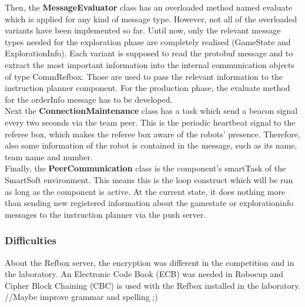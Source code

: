 Then, the \textbf{MessageEvaluator} class has an overloaded method named evaluate which is applied for any kind of message type. However, not all of the overloaded variants have been implemented so far. Until now, only the relevant message types needed for the exploration phase are completely realised (GameState and ExplorationInfo). Each variant is supposed to read the protobuf message and to extract the most important information into the internal communication objects of type CommRefbox. Those are used to pass the relevant information to the instruction planner component. For the production phase, the evaluate method for the orderInfo message has to be developed.\\

Next the \textbf{ConnectionMaintenance} class has a task which send a beacon signal every two seconds via the team peer. This is the periodic heartbeat signal to the referee box, which makes the referee box aware of the robots’ presence. Therefore, also some information of the robot is contained in the message, such as its name, team name and number.\\

Finally, the \textbf{PeerCommunication} class is the component’s smartTask of the SmartSoft environment. This means this is the loop construct which will be run as long as the component is active. At the current state, it does nothing more than sending new registered information about the gamestate or explorationinfo messages to the instruction planner via the push server.\\


\subsubsection{Difficulties}

About the Refbox server, the encryption was different in the competition and in the laboratory. An Electronic Code Book (ECB) was needed in Robocup and Cipher Block Chaining (CBC) is used with the Refbox installed in the laboratory. \\

//Maybe improve grammar and spelling ;) 